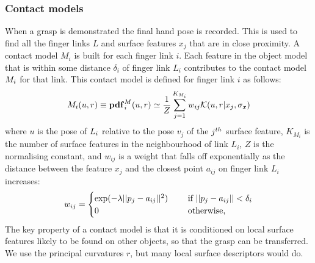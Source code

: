 \subsubsection{Contact models}
When a grasp is demonstrated the final hand pose is recorded. This is used to find all the finger links $L$ and surface features $x_j$ that are in close proximity. A contact model $M_i$ is built for each finger link $i$. Each feature in the object model that is within some distance $\delta_i$ of finger link $L_i$ contributes to the contact model $M_i$ for that link. This contact model is defined for finger link $i$ as follows:
\begin{equation}
\cm_i(u, r) \equiv \pdf^\cm_i(u, r) \simeq \frac{1}{Z} \sum_{j=1}^{K_{M_i}} w_{ij} \mathcal{K}(u, r | {x_j}, \sigma_{x})
\label{eq:cm}
\end{equation}
where $u$ is the pose of $L_i$ relative to the pose $v_j$ of the $j^{\mathnormal{th}}$ surface feature, $K_{M_i}$ is the number of surface features in the neighbourhood of link $L_i$, $Z$ is the normalising constant, and $w_{ij}$ is a weight that falls off exponentially as the distance between the feature $x_j$ and the closest point $a_{ij}$ on finger link $L_i$ increases:
\begin{equation}
w_{ij} = \begin{cases}\exp(-\lambda ||p_j-a_{ij}||^2) \quad &\textnormal{ if } ||p_j-a_{ij}|| < \delta_i\\
0 \quad &\textnormal{ otherwise},\end{cases}
\label{eq:learning.modeldist.wgh}
\end{equation}
The key property of a contact model is that it is conditioned on local surface features likely to be found on other objects, so that the grasp can be transferred. We use the principal curvatures $r$, but many local surface descriptors would do. %
%

